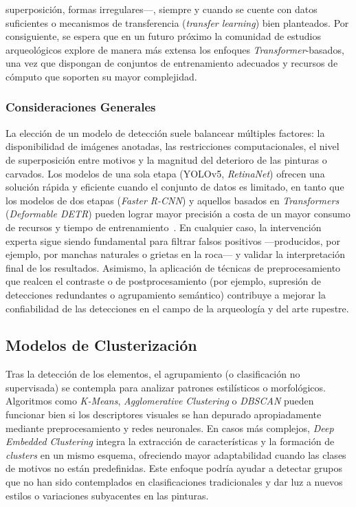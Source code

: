 superposición, formas irregulares—, siempre y cuando se cuente con datos suficientes o mecanismos de transferencia (\textit{transfer learning}) bien planteados. Por consiguiente, se espera que en un futuro próximo la comunidad de estudios arqueológicos explore de manera más extensa los enfoques \textit{Transformer}-basados, una vez que dispongan de conjuntos de entrenamiento adecuados y recursos de cómputo que soporten su mayor complejidad.

\subsubsection*{Consideraciones Generales}

La elección de un modelo de detección suele balancear múltiples factores: la disponibilidad de imágenes anotadas, las restricciones computacionales, el nivel de superposición entre motivos y la magnitud del deterioro de las pinturas o carvados. Los modelos de una sola etapa (YOLOv5, \textit{RetinaNet}) ofrecen una solución rápida y eficiente cuando el conjunto de datos es limitado, en tanto que los modelos de dos etapas (\textit{Faster R-CNN}) y aquellos basados en \textit{Transformers} (\textit{Deformable DETR}) pueden lograr mayor precisión a costa de un mayor consumo de recursos y tiempo de entrenamiento~\cite{horn2022,davis2021,jalandoni2022,li2022,tsigkas2020}. En cualquier caso, la intervención experta sigue siendo fundamental para filtrar falsos positivos —producidos, por ejemplo, por manchas naturales o grietas en la roca— y validar la interpretación final de los resultados. Asimismo, la aplicación de técnicas de preprocesamiento que realcen el contraste o de postprocesamiento (por ejemplo, supresión de detecciones redundantes o agrupamiento semántico) contribuye a mejorar la confiabilidad de las detecciones en el campo de la arqueología y del arte rupestre.

\subsection{Modelos de Clusterización}

Tras la detección de los elementos, el agrupamiento (o clasificación no supervisada) se contempla para analizar patrones estilísticos o morfológicos. Algoritmos como \textit{K-Means}, \textit{Agglomerative Clustering} o \textit{DBSCAN} pueden funcionar bien si los descriptores visuales se han depurado apropiadamente mediante preprocesamiento y redes neuronales. En casos más complejos, \textit{Deep Embedded Clustering} integra la extracción de características y la formación de \textit{clusters} en un mismo esquema, ofreciendo mayor adaptabilidad cuando las clases de motivos no están predefinidas. Este enfoque podría ayudar a detectar grupos que no han sido contemplados en clasificaciones tradicionales y dar luz a nuevos estilos o variaciones subyacentes en las pinturas.


